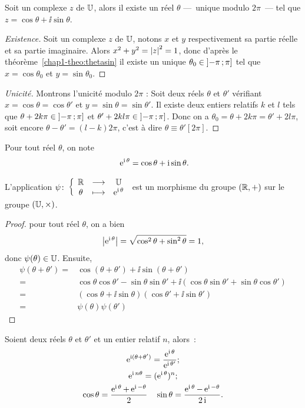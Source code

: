 %
\begin{prop}\label{prop:expsurj}
  Soit un complexe $z$ de $\mathbb{U}$, alors il existe un réel $\theta$ ---~unique modulo $2\pi$~--- tel que $z=\cos\theta +\ii\sin\theta$.
\end{prop}
\begin{proof}[Existence]
  Soit un complexe $z$ de $\mathbb{U}$, notons $x$ et $y$ respectivement sa partie réelle et sa partie imaginaire. Alors $x^2+y^2=\left\lvert z\right\rvert^2=1$, donc d'après le théorème~\ref{chap1-theo:thetasin} il existe un unique $\theta_0 \in \left] -\pi \, ;  \pi \right]$ tel que $x=\cos\theta_0$ et $y=\sin\theta_0$.
\end{proof}
\begin{proof}[Unicité]
  Montrons l'unicité modulo $2\pi$ : Soit deux réels $\theta$ et $\theta'$ vérifiant  $x=\cos \theta=\cos \theta'$ et $y=\sin \theta = \sin \theta'$. Il existe deux entiers relatifs $k$ et $l$ tels que $\theta +2k \pi \in \left] -\pi \, ;  \pi \right]$ et $\theta' +2kl \pi \in \left] -\pi \, ;  \pi \right]$. Donc on a $\theta_0=\theta + 2k \pi=\theta'+2l \pi$, soit encore $\theta-\theta'=(l-k) 2\pi$, c'est à dire $\theta \equiv \theta' [2\pi]$.
\end{proof}
%
\begin{defdef}
  Pour tout réel $\theta$, on note
  \begin{equation}\
    \operatorname{e}^{\operatorname{i} \theta}=\cos\theta +\operatorname{i}\sin\theta.
  \end{equation}
\end{defdef}
%
\begin{prop}
  L'application $\psi\colon \left\{\begin{array}{ccc} \mathbb{R} & \longrightarrow &\mathbb{U}\\ \theta & \longmapsto & \operatorname{e}^{\operatorname{i} \theta} \end{array} \right.$ est un morphisme du groupe $(\mathbb{R},+)$ sur le groupe $(\mathbb{U},\times)$.
\end{prop}
\begin{proof}
  pour tout réel $\theta$, on a bien
  \begin{equation}
    \left\lvert\operatorname{e}^{\operatorname{i} \theta}\right\rvert=\sqrt{\cos^2 \theta + \sin^2 \theta}=1,
  \end{equation}
  donc $\psi(\theta) \in \mathbb{U}$. Ensuite,
  \begin{align}
    \psi(\theta +\theta') = &\cos(\theta +\theta') + \ii \sin(\theta + \theta')\\
    =&\cos \theta \cos \theta' - \sin \theta \sin \theta' +\ii(\cos \theta \sin \theta' + \sin \theta \cos \theta')\\
    =&(\cos \theta + \ii \sin \theta)(\cos \theta' + \ii \sin \theta')\\
    =&\psi(\theta) \psi(\theta')
  \end{align}
\end{proof}
%
\begin{prop} Soient deux réels $\theta$ et $\theta'$ et un entier relatif $n$, alors~:
  \begin{gather}
    \operatorname{e}^{\operatorname{i} (\theta+\theta')}=\frac{\operatorname{e}^{\operatorname{i} \theta}}{\operatorname{e}^{\operatorname{i} \theta'}};\\
    \operatorname{e}^{\operatorname{i} n \theta}=(\operatorname{e}^{\operatorname{i} \theta})^n;\\
    \cos \theta = \frac{\operatorname{e}^{\operatorname{i} \theta}+\operatorname{e}^{\operatorname{i} -\theta}}{2} \quad \sin \theta = \frac{\operatorname{e}^{\operatorname{i} \theta}-\operatorname{e}^{\operatorname{i} -\theta}}{2\operatorname{i}}.
  \end{gather}
\end{prop}

